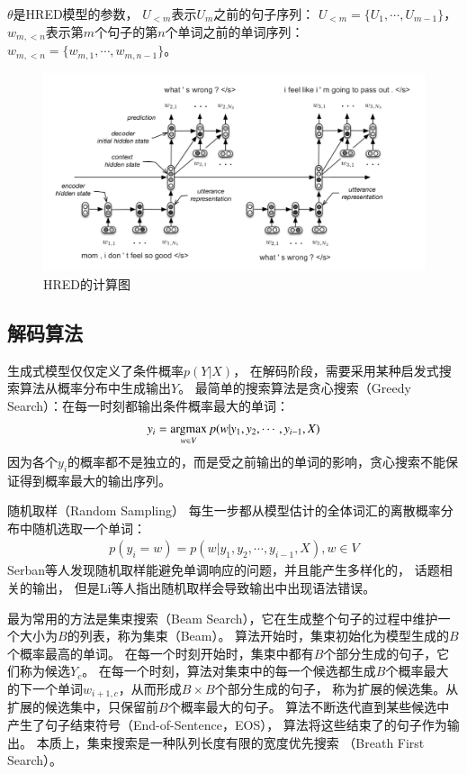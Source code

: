$\theta$是HRED模型的参数，
$U_{<m}$表示$U_m$之前的句子序列：
$U_{<m} = \{ U_1, \cdots, U_{m-1} \}$，
$w_{m, <n}$表示第$m$个句子的第$n$个单词之前的单词序列：
$w_{m, <n} = \{ w_{m, 1}, \cdots, w_{m, n-1} \}$。

\begin{figure}[H]
    \centering
    \includegraphics[width=\textwidth]{figure/HRED.png}
    \caption{HRED的计算图}
    \label{fig:HRED_computation_graph}
\end{figure}


\subsection{解码算法}\label{subsec:decode}
生成式模型仅仅定义了条件概率$p(Y|X)$，
在解码阶段，需要采用某种启发式搜索算法从概率分布中生成输出$Y$。
最简单的搜索算法是贪心搜索（Greedy Search）：在每一时刻都输出条件概率最大的单词：
\begin{align}
    y_i = \operatorname*{argmax}_{w \in V} p(w|y_1, y_2, \cdots, y_{i-1}, X)
\end{align}
因为各个$y_i$的概率都不是独立的，而是受之前输出的单词的影响，贪心搜索不能保证得到概率最大的输出序列。

随机取样（Random Sampling）
每生一步都从模型估计的全体词汇的离散概率分布中随机选取一个单词：
\begin{align}
    p(y_i = w) = p(w|y_1, y_2, \cdots, y_{i-1}, X), w \in V
\end{align}
Serban等人发现随机取样能避免单调响应的问题，并且能产生多样化的，
话题相关的输出，
但是Li等人指出随机取样会导致输出中出现语法错误。

最为常用的方法是集束搜索（Beam Search），它在生成整个句子的过程中维护一个大小为$B$的列表，称为集束（Beam）。
算法开始时，集束初始化为模型生成的$B$个概率最高的单词。
在每一个时刻开始时，集束中都有$B$个部分生成的句子，它们称为候选$Y_c$。
在每一个时刻，算法对集束中的每一个候选都生成$B$个概率最大的下一个单词$w_{i+1, c}$，从而形成$B \times B$个部分生成的句子，
称为扩展的候选集。从扩展的候选集中，只保留前$B$个概率最大的句子。
算法不断迭代直到某些候选中产生了句子结束符号（End-of-Sentence，EOS），
算法将这些结束了的句子作为输出。
本质上，集束搜索是一种队列长度有限的宽度优先搜索
（Breath First Search）。

